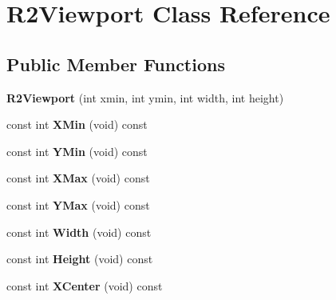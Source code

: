 \hypertarget{class_r2_viewport}{}\section{R2\+Viewport Class Reference}
\label{class_r2_viewport}
\subsection*{Public Member Functions}
\begin{DoxyCompactItemize}
\item 
{\bfseries R2\+Viewport} (int xmin, int ymin, int width, int height)\hypertarget{class_r2_viewport_a28653acc6bfb680cb42032d1772d37e2}{}\label{class_r2_viewport_a28653acc6bfb680cb42032d1772d37e2}

\item 
const int {\bfseries X\+Min} (void) const \hypertarget{class_r2_viewport_ae53df8000d7292123beb9d324ecebb30}{}\label{class_r2_viewport_ae53df8000d7292123beb9d324ecebb30}

\item 
const int {\bfseries Y\+Min} (void) const \hypertarget{class_r2_viewport_acc08aff80f738660de20a5001418c39b}{}\label{class_r2_viewport_acc08aff80f738660de20a5001418c39b}

\item 
const int {\bfseries X\+Max} (void) const \hypertarget{class_r2_viewport_abc82ed4efa767dafbdff455da6ae5872}{}\label{class_r2_viewport_abc82ed4efa767dafbdff455da6ae5872}

\item 
const int {\bfseries Y\+Max} (void) const \hypertarget{class_r2_viewport_ad33160c9a2d6599b97334cf8b60dd4e1}{}\label{class_r2_viewport_ad33160c9a2d6599b97334cf8b60dd4e1}

\item 
const int {\bfseries Width} (void) const \hypertarget{class_r2_viewport_a081b008b346e2c1fb669b439aec07947}{}\label{class_r2_viewport_a081b008b346e2c1fb669b439aec07947}

\item 
const int {\bfseries Height} (void) const \hypertarget{class_r2_viewport_aab1f41debf3a23e63f34fd20abc53747}{}\label{class_r2_viewport_aab1f41debf3a23e63f34fd20abc53747}

\item 
const int {\bfseries X\+Center} (void) const \hypertarget{class_r2_viewport_adb2f114783ec31091819670d7b7ac35b}{}\label{class_r2_viewport_adb2f114783ec31091819670d7b7ac35b}


\end{DoxyCompactItemize}
